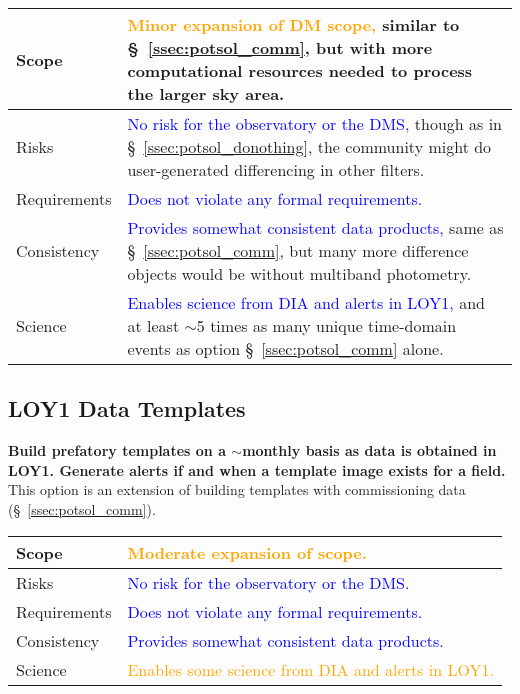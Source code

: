 \documentclass[DM,lsstdraft,toc]{lsstdoc}
\begin{document}
\begin{center}
\begin{tabular}{|p{2.5cm}|p{13cm}|}
\hline
Scope & \textcolor{orange}{Minor expansion of DM scope,} similar to \S~\ref{ssec:potsol_comm}, but with more computational resources needed to process the larger sky area.  \\
\hline
Risks & \textcolor{blue}{No risk for the observatory or the DMS,} though as in \S~\ref{ssec:potsol_donothing}, the community might do user-generated differencing in other filters. \\
\hline
Requirements & \textcolor{blue}{Does not violate any formal requirements.} \\
\hline
Consistency & \textcolor{blue}{Provides somewhat consistent data products,} same as \S~\ref{ssec:potsol_comm}, but many more difference objects would be without multiband photometry.  \\
\hline
Science & \textcolor{blue}{Enables science from DIA and alerts in LOY1,} and at least $\sim$5 times as many unique time-domain events as option \S~\ref{ssec:potsol_comm} alone. \\
\hline
\end{tabular}
\end{center}

\clearpage
\subsection{LOY1 Data Templates}\label{ssec:potsol_cont}

{\bf Build prefatory templates on a $\sim$monthly basis as data is obtained in LOY1. Generate alerts if and when a template image exists for a field.} This option is an extension of building templates with commissioning data (\S~\ref{ssec:potsol_comm}).

\begin{center}
\begin{tabular}{|p{2.5cm}|p{13cm}|}
\hline
Scope & \textcolor{orange}{Moderate expansion of scope.} \\
\hline
Risks & \textcolor{blue}{No risk for the observatory or the DMS.} \\
\hline
Requirements & \textcolor{blue}{Does not violate any formal requirements.} \\
\hline
Consistency & \textcolor{blue}{Provides somewhat consistent data products.} \\
\hline
Science & \textcolor{orange}{Enables some science from DIA and alerts in LOY1.} \\
\hline
\end{tabular}
\end{center}
\end{document}
